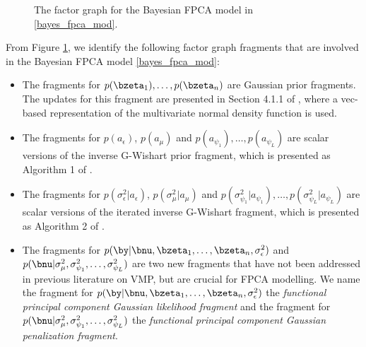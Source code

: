 \documentclass[12pt]{article}
\def\sigsqeps{\sigma^2_{\epsilon}}
\def\aeps{a_{\epsilon}}
\def\sigsqmu{\sigma^2_{\mu}}
\def\amu{a_{\mu}}
\newcommand\sigsqpsi[1]{\sigma^2_{\psi_{#1}}}
\newcommand\apsi[1]{a_{\psi_{#1}}}
\theoremstyle{plain}
\theoremstyle{definition}
\theoremstyle{remark}
\begin{document}
\begin{figure}
\caption{The factor graph for the Bayesian FPCA model in \eqref{bayes_fpca_mod}.}
\label{fig:fg_fpca}
\end{figure}

From Figure \ref{fig:fg_fpca}, we identify the following factor graph fragments that are involved in the Bayesian
FPCA model \eqref{bayes_fpca_mod}:

\begin{itemize}
	\item The fragments for $p (\bzeta_1), \dots, p(\bzeta_n)$ are Gaussian prior fragments. The updates for
	this fragment are presented in Section 4.1.1 of , where a vec-based representation of the
	multivariate normal density function is used.
	\item The fragments for $p (\aeps)$, $p (\amu)$ and $p (\apsi{1}), \dots, p (\apsi{L})$ are scalar versions
	of the inverse G-Wishart prior fragment, which is presented as Algorithm 1 of .
	\item The fragments for $p (\sigsqeps | \aeps)$, $p (\sigsqmu | \amu)$ and $p (\sigsqpsi{1} | \apsi{1}), \dots,
	p (\sigsqpsi{L} | \apsi{L})$ are scalar versions of the iterated inverse G-Wishart fragment, which is presented
	as Algorithm 2 of .
	\item The fragments for $p (\by | \bnu, \bzeta_1, \dots, \bzeta_n, \sigsqeps)$ and $p (\bnu | \sigsqmu,
	\sigsqpsi{1}, \dots, \sigsqpsi{L})$ are two new fragments that have not been addressed in previous literature
	on VMP, but are crucial for FPCA modelling.
	We name the fragment for $p (\by | \bnu, \bzeta_1, \dots, \bzeta_n, \sigsqeps)$ the \emph{functional
	principal component
	Gaussian likelihood fragment} and the fragment for $p (\bnu | \sigsqmu, \sigsqpsi{1}, \dots, \sigsqpsi{L})$
	the \emph{functional principal component Gaussian penalization fragment}.
\end{itemize}
\end{document}
